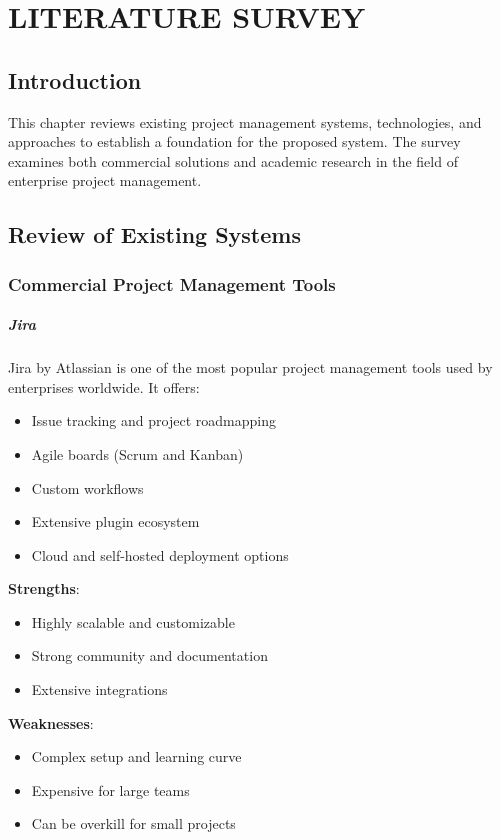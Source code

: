 \documentclass[12pt,a4paper,twoside]{book}
\newcommand{\subsubsubsection}[1]{\paragraph{#1}}
\begin{document}
\chapter{LITERATURE SURVEY}

\section{Introduction}

This chapter reviews existing project management systems, technologies, and approaches to establish a foundation for the proposed system. The survey examines both commercial solutions and academic research in the field of enterprise project management.

\section{Review of Existing Systems}

\subsection{Commercial Project Management Tools}

\subsubsubsection{Jira}
Jira by Atlassian is one of the most popular project management tools used by enterprises worldwide. It offers:
\begin{itemize}
    \item Issue tracking and project roadmapping
    \item Agile boards (Scrum and Kanban)
    \item Custom workflows
    \item Extensive plugin ecosystem
    \item Cloud and self-hosted deployment options
\end{itemize}

\textbf{Strengths}:
\begin{itemize}
    \item Highly scalable and customizable
    \item Strong community and documentation
    \item Extensive integrations
\end{itemize}

\textbf{Weaknesses}:
\begin{itemize}
    \item Complex setup and learning curve
    \item Expensive for large teams
    \item Can be overkill for small projects
\end{itemize}
\end{document}
